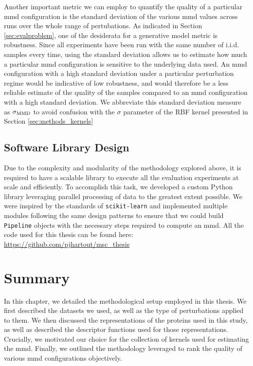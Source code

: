 Another important metric we can employ to quantify the quality of a particular
\acrshort{mmd} configuration is the standard deviation of the various
\acrshort{mmd} values across runs over the whole range of pertubations. As
indicated in Section \ref{sec:evalproblem}, one of the desiderata for a
generative model metric is robustness. Since all experiments have been run with
the same number of i.i.d. samples every time, using the standard deviation
allows us to estimate how much a particular \acrshort{mmd} configuration is sensitive
to the underlying data used. An \acrshort{mmd} configuration with a high standard
deviation under a particular perturbation regime would be indicative of low
robustness, and would therefore be a less reliable estimate of the quality of
the samples compared to an \acrshort{mmd} configuration with a high standard
deviation. We abbreviate this standard deviation measure as $\sigma_{\text{MMD}}$ to
avoid confusion with the $\sigma$ parameter of the RBF kernel presented in
Section \ref{sec:methods_kernels}


\subsection{Software Library Design}


Due to the complexity and modularity of the methodology explored above, it is
required to have a scalable library to execute all the evaluation experiments at
scale and efficiently. To accomplish this task, we developed a custom Python
library leveraging parallel processing of data to the greatest extent possible.
We were inspired by the standards of \texttt{scikit-learn} and implemented
multiple modules following the same design patterns to ensure that we could
build \texttt{Pipeline} objects with the necessary steps required to compute an
\acrshort{mmd}. All the code used for this thesis can be found here:
\url{https://github.com/pjhartout/msc_thesis}


\section{Summary}

In this chapter, we detailed the methodological setup employed in this thesis.
We first described the datasets we used, as well as the type of perturbations
applied to them. We then discussed the representations of the proteins used in
this study, as well as described the descriptor functions used for those
representations. Crucially, we motivated our choice for the collection of
kernels used for estimating the \acrshort{mmd}. Finally, we outlined the
methodology leveraged to rank the quality of various \acrshort{mmd}
configurations objectively.
